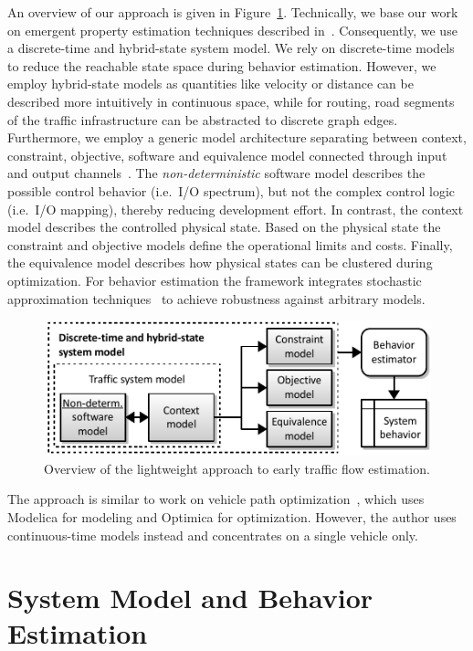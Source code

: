 \documentclass[conference]{../cls/IEEEtran}
\begin{document}
An overview of our approach is given in Figure~\ref{fig:framework}. Technically, we base our work on emergent property estimation techniques described in~\cite{Hackenberg2012}. Consequently, we use a discrete-time and hybrid-state system model. We rely on discrete-time models to reduce the reachable state space during behavior estimation. However, we employ hybrid-state models as quantities like velocity or distance can be described more intuitively in continuous space, while for routing, road segments of the traffic infrastructure can be abstracted to discrete graph edges. Furthermore, we employ a generic model architecture separating between context, constraint, objective, software and equivalence model connected through input and output channels~\cite{Hackenberg2014}. The \textit{non-deterministic} software model describes the possible control behavior (i.e.\ I/O spectrum), but not the complex control logic (i.e.\ I/O mapping), thereby reducing development effort. In contrast, the context model describes the controlled physical state. Based on the physical state the constraint and objective models define the operational limits and costs. Finally, the equivalence model describes how physical states can be clustered during optimization. For behavior estimation the framework integrates stochastic approximation techniques~\cite{Pereira1991} to achieve robustness against arbitrary models.

\begin{figure}[h]
	\centering
	\includegraphics{../gfx/framework.pdf}
	\caption{Overview of the lightweight approach to early traffic flow estimation.}
	\label{fig:framework}
\end{figure}

The approach is similar to work on vehicle path optimization~\cite{Danielsson2007}, which uses Modelica for modeling and Optimica for optimization. However, the author uses continuous-time models instead and concentrates on a single vehicle only.

\section{System Model and Behavior Estimation}
\end{document}
